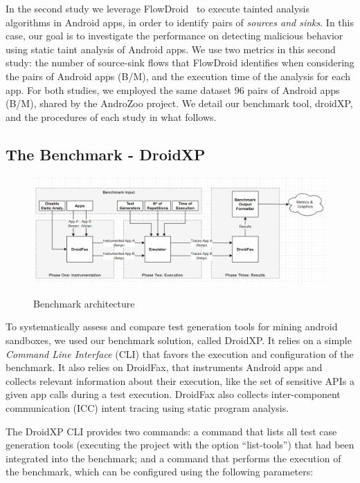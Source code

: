In the second study we leverage FlowDroid~\cite{DBLP:conf/pldi/ArztRFBBKTOM14} to execute
tainted analysis algorithms in Android apps, in order to identify pairs of \emph{sources and sinks}. In this case,
our goal is to investigate the performance on detecting malicious
behavior using static taint analysis of Android apps. We use two metrics in this second study: the number
of source-sink flows that FlowDroid identifies when considering the pairs of Android apps (B/M), and the
execution time of the analysis for each app.
For both studies, we employed the same dataset $96$ pairs of Android apps (B/M),
shared by the AndroZoo \cite{DBLP:conf/msr/AllixBKT16} project. We detail our benchmark tool, droidXP, and the procedures of each study in what follows.

\subsection{The Benchmark - DroidXP}

\begin{figure}[ht]
  \includegraphics[width=1\textwidth]{images/benchmark4.png}
  \label{benchArq}
  \caption{Benchmark architecture}
  \label{fig:benchArq}
\end{figure}


To systematically assess and compare test generation tools for mining android sandboxes, we used our benchmark solution, called DroidXP. It relies on a simple \emph{Command Line Interface} (CLI) that favors the execution and configuration of the benchmark. It also relies on DroidFax, that instruments Android apps and collects relevant information about their execution, like the set of sensitive APIs a given
app calls during a test execution. DroidFax also collects inter-component communication (ICC) intent  tracing  using  static  program analysis.

The DroidXP CLI provides two commands: a command that lists all test case
generation tools (executing the project with the option ``list-tools'') that had been
integrated into the benchmark; and a command that performs the execution of the benchmark,
which can be configured using the following parameters:

